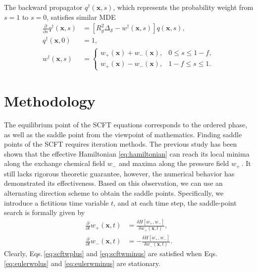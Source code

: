 \documentclass[final,1p,times]{elsarticle}
\newcommand{\bx}{\mathbf{x}}
\newcommand{\calS}{\mathcal{S}}
\begin{document}
The backward propagator $q^{\dag}(\bx,s)$, which represents the probability 
weight from $s=1$ to $s=0$, satisfies similar MDE  
\begin{equation}
  \label{eq:MDEplus}
	\begin{aligned}
  \frac{\partial }{\partial s}q^\dag(\bx,s) &=
	[R_g^2 \Delta_{\calS} - w^\dag(\bx,s)] q(\bx,s), 
	\\
  q^\dag(\bx,0) &= 1,
  \\
	w^\dag(\bx,s) &= \left\{   
	\begin{array}{rl}
		w_+(\bx)+w_-(\bx), &  0\leq s \leq 1-f,
		\\
		w_+(\bx) -w_-(\bx), &  1-f\leq s \leq 1.
	\end{array}
\right.
	\end{aligned}
\end{equation}


\section{Methodology}
\label{sec:method}


%

The equilibrium point of the SCFT equations corresponds to the ordered phase,
as well as the saddle point from the viewpoint of mathematics.  Finding 
saddle points of the SCFT requires iteration methods.  The previous study has
been shown that the effective Hamiltonian \eqref{eq:hamiltonian} can reach its
local minima along the exchange chemical field $w_-$ and maxima along the
pressure field $w_+$\,\cite{jiang2015analytic, fredrickson2002field}. It still
lacks rigorous theoretic guarantee, however, the numerical behavior has
demonstrated its effectiveness. Based on this observation, we can use an
alternating direction scheme to obtain the saddle points.  Specifically, we
introduce a fictitious time variable $t$, and at each time step, the
saddle-point search is formally given by 
\begin{align}
	\frac{\partial }{\partial t}w_+(\bx,t) &= \frac{\delta
	H[w_+, w_-]}{\delta w_+(\bx, t)},
	\label{eq:eulerwplus}
	\\
	\frac{\partial }{\partial t}w_-(\bx,t) &= -\frac{\delta
	H[w_+, w_-]}{\delta w_-(\bx, t)}.
	\label{eq:eulerwminus}
\end{align}
Clearly, Eqs.\,\eqref{eq:scftwplus} and \eqref{eq:scftwminus} are
satisfied when Eqs.\,\eqref{eq:eulerwplus} and
\eqref{eq:eulerwminus} are stationary.
\end{document}
